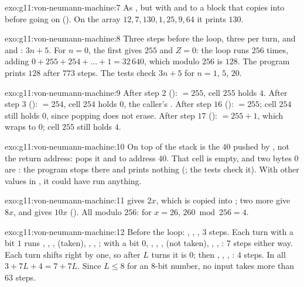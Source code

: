 \begin{solution}{exo:g11:von-neumann-machine:7}
As , but with  and  to a block that copies  into 
before going on (). On the array $12, 7, 130, 1, 25, 9, 64$ it prints $130$.
\end{solution}

\begin{solution}{exo:g11:von-neumann-machine:8}
Three steps before the loop, three per turn, and  and : $3n + 5$. For $n = 0$, the first
 gives $255$ and $Z = 0$: the loop runs $256$ times, adding $0 + 255 + 254 + \dots + 1 = 32\,640$, which
modulo $256$ is $128$. The program prints $128$ after $773$ steps. The tests check $3n + 5$ for $n = 1$, $5$, $20$.
\end{solution}

\begin{solution}{exo:g11:von-neumann-machine:9}
After step $2$ ():  $= 255$, cell $255$ holds $4$. After step $3$ (): 
$= 254$, cell $254$ holds $0$, the caller's . After step $16$ ():  $= 255$; cell $254$
still holds $0$, since popping does not erase. After step $17$ ():  $= 255 + 1$, which wraps to
$0$; cell $255$ still holds $4$.
\end{solution}

\begin{solution}{exo:g11:von-neumann-machine:10}
On top of the stack is the $40$ pushed by , not the return address:  pops it and  to
address $40$. That cell is empty, and two bytes $0$ are : the program stops there and prints nothing
(; the tests check it). With other values in , it could have run anything.
\end{solution}

\begin{solution}{exo:g11:von-neumann-machine:11}
 gives $2x$, which is copied into ; two more  give $8x$, and 
gives $10x$ (). All modulo $256$: for $x = 26$, $260 \bmod 256 = 4$.
\end{solution}

\begin{solution}{exo:g11:von-neumann-machine:12}
Before the loop: , , , $3$ steps. Each turn with a bit $1$ runs , ,
,  (taken), , , ; with a bit $0$, , ,
,  (not taken), , , : $7$ steps either way. Each turn shifts
 right by one, so after $L$ turns it is $0$; then , , , : $4$
steps. In all $3 + 7L + 4 = 7 + 7L$. Since $L \le 8$ for an $8$-bit number, no input takes more than $63$ steps.
\end{solution}

